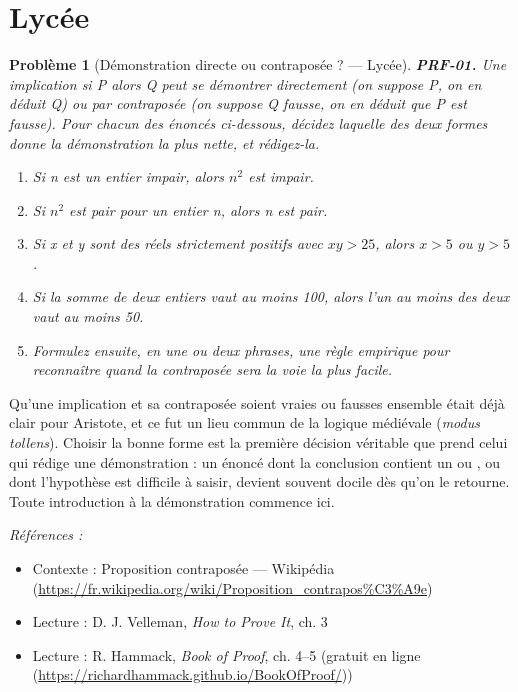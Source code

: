\documentclass[11pt]{article}
\newtheorem{problem}{Problème}
\newenvironment{refs}{\par\small\noindent\emph{Références :}\begin{itemize}\setlength\itemsep{0pt}}{\end{itemize}\normalsize}
\begin{document}
\section*{Lycée}

\begin{problem}[{Démonstration directe ou contraposée ? --- Lycée}]
\textbf{PRF-01.} Une implication \og{} si P alors Q \fg{} peut se démontrer directement
(on suppose P, on en déduit Q) ou par contraposée (on suppose Q fausse, on en déduit que
P est fausse). Pour chacun des énoncés ci-dessous, décidez laquelle des deux formes donne
la démonstration la plus nette, et rédigez-la.
\begin{enumerate}
\item[(a)] Si n est un entier impair, alors $ n^2 $ est impair.
\item[(b)] Si $ n^2 $ est pair pour un entier n, alors n est pair.
\item[(c)] Si x et y sont des réels strictement positifs avec $ xy >25 $, alors $ x >5 $ ou
$ y >5 $.
\item[(d)] Si la somme de deux entiers vaut au moins 100, alors l'un au moins des deux vaut au
moins 50.
\item[(e)] Formulez ensuite, en une ou deux phrases, une règle empirique pour reconnaître quand
la contraposée sera la voie la plus facile.
\end{enumerate}

\end{problem}

\noindent Qu'une implication et sa contraposée soient vraies ou fausses ensemble
était déjà clair pour Aristote, et ce fut un lieu commun de la logique médiévale
(\textit{modus tollens}). Choisir la bonne forme est la première décision véritable que prend
celui qui rédige une démonstration : un énoncé dont la conclusion contient un \og{} ou \fg{}, ou
dont l'hypothèse est difficile à saisir, devient souvent docile dès qu'on le retourne.
Toute introduction à la démonstration commence ici.

\begin{refs}
\item Contexte : Proposition contraposée --- Wikipédia (\url{https://fr.wikipedia.org/wiki/Proposition_contrapos%C3%A9e})
\item Lecture : D. J. Velleman, \textit{How to Prove It}, ch. 3
\item Lecture : R. Hammack, \textit{Book of Proof}, ch. 4--5 (gratuit en ligne (\url{https://richardhammack.github.io/BookOfProof/}))
\end{refs}
\end{document}
